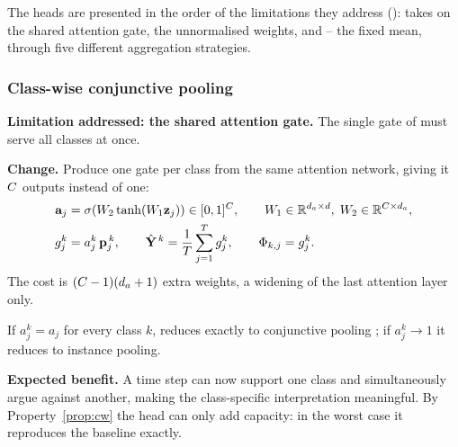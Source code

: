 The heads are presented in the order of the limitations they address ():
 takes on the shared attention gate,  the
unnormalised weights, and -- the fixed mean, through
five different aggregation strategies.


\subsubsection{Class-wise conjunctive pooling}
\label{sec:pool:classwise}

\textbf{Limitation addressed: the shared attention gate.} The single gate of 
must serve all classes at once.

\textbf{Change.} Produce one gate per class from the same attention network, giving it $C$
outputs instead of one:
\begin{align}
  \mathbf{a}_j &= \sigma\!\left(W_2 \tanh(W_1 \mathbf{z}_j)\right) \in [0,1]^{C},
  \qquad W_1 \in \mathbb{R}^{d_a \times d},\; W_2 \in \mathbb{R}^{C \times d_a},
  \label{eq:cw_gate}\\
  g_j^k &= a_j^k \, \mathbf{p}_j^{\,k},
  \qquad
  \hat{\mathbf{Y}}^{\,k} = \frac{1}{T}\sum_{j=1}^{T} g_j^k,
  \qquad
  \Phi_{k,j} = g_j^k .
  \label{eq:cw_bag}
\end{align}
The cost is $(C-1)(d_a+1)$ extra weights, a widening of the last attention layer only.

\begin{property}
\label{prop:cw}
If $a_j^k = a_j$ for every class $k$,  reduces exactly to conjunctive pooling
; if $a_j^k \to 1$ it reduces to instance pooling.
\end{property}

\textbf{Expected benefit.} A time step can now support one class and simultaneously argue against
another, making the class-specific interpretation meaningful. By Property~\ref{prop:cw} the head can
only add capacity: in the worst case it reproduces the baseline exactly.

